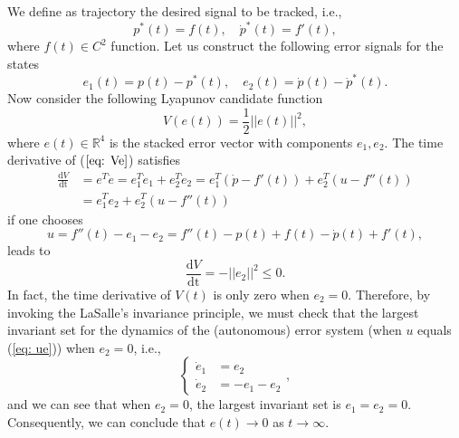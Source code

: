 \documentclass[11pt,a4paper,titlepage]{article}
\begin{document}
We define as trajectory the desired signal to be tracked, i.e.,
\begin{equation}
	p^*(t) = f(t), \quad \dot p^*(t) = f'(t),
\end{equation}
where $f(t) \in C^2$ function.
Let us construct the following error signals for the states
\begin{equation}
	e_1(t) = p(t) - p^*(t), \quad e_2(t) = \dot p(t) - \dot p^*(t).
\end{equation}
Now consider the following Lyapunov candidate function
\begin{equation}
	V(e(t)) = \frac{1}{2}||e(t)||^2,
	\label{eq: Ve}
\end{equation}
	where $e(t)\in\mathbb{R}^4$ is the stacked error vector with components $e_1, e_2$. The time derivative of ($\ref{eq: Ve}$) satisfies
\begin{align}
	\frac{\mathrm{d}V}{\mathrm{dt}} &= e^T\dot e = e_1^T\dot e_1 + e_2^T\dot e_2 =  e_1^T(\dot p - f'(t)) + e_2^T(u - f''(t)) \nonumber \\
	&= e_1^Te_2 + e_2^T(u - f''(t))
\end{align}
	if one chooses 
	\begin{equation}
	u = f''(t) - e_1 - e_2 = f''(t) - p(t) + f(t) -\dot p(t) + f'(t),
	\label{eq: ue}
	\end{equation}
	leads to
	\begin{equation}
\frac{\mathrm{d}V}{\mathrm{dt}} = -||e_2||^2 \leq 0.
	\end{equation}
	In fact, the time derivative of $V(t)$ is only zero when $e_2 = 0$. Therefore, by invoking the LaSalle's invariance principle, we must check that the largest invariant set for the dynamics of the (autonomous) error system (when $u$ equals (\ref{eq: ue})) when $e_2 = 0$, i.e., 
	\begin{equation}
	\begin{cases}
	\dot e_1 &= e_2 \\
	\dot e_2 &= -e_1 -e_2
	\end{cases},
	\end{equation}
	and we can see that when $e_2 = 0$, the largest invariant set is $e_1 = e_2 = 0$. Consequently, we can conclude that $e(t) \to 0$ as $t\to\infty$.
\end{document}
